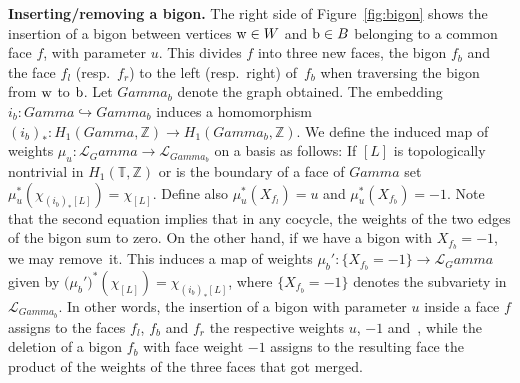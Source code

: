 \documentclass[10pt,a4paper]{amsart}
\numberwithin{equation}{section}
\newcommand{\Z}{{\mathbb Z}}
\newcommand{\T}{{\mathbb T}}
\newcommand{\ra}{\rightarrow}
\newcommand{\w}{{\rm w}}
\newcommand{\bw}{{\rm b}}
\def\Gamma{Gamma}
\begin{document}
	
	{\bf Inserting/removing a bigon.}
	The right side of Figure~\ref{fig:bigon} shows the insertion of a bigon between vertices $\w \in W$ and $\bw \in B$ belonging to a common face $f$, with parameter $u$. This divides $f$ into three new faces, the bigon $f_b$ and the face $f_l$ (resp.\ $f_r$) to the left (resp.\ right) of~$f_b$ when traversing the bigon from $\rm w$ to $\rm b$. Let $\Gamma_b$ denote the graph obtained. The embedding $i_b\colon \Gamma \hookrightarrow \Gamma_b$ induces a homomorphism $(i_b)_*\colon H_1(\Gamma,\Z) \ra H_1(\Gamma_b,\Z)$. We define the induced map of weights $\mu_u\colon \mathcal L_\Gamma \ra \mathcal L_{\Gamma_b}$ on a basis as follows: If $[L]$ is topologically nontrivial in $H_1(\T,\Z)$ or is the boundary of a face of $\Gamma$ set $\mu_u^*(\chi_{(i_b)_*[L]})=\chi_{[L]}$. Define also $\mu_u^*(X_{f_l})=u$ and $\mu_u^*(X_{f_b})=-1$. Note that the second equation implies that in any cocycle, the weights of the two edges of the bigon sum to zero. On the other hand, if we have a bigon with $X_{f_b}=-1$, we may remove~it. This induces a map of weights $\mu_b'\colon \{X_{f_b}=-1\} \ra \mathcal L_\Gamma$ given by $\big(\mu_b'\big)^*(\chi_{[L]})=\chi_{(i_b)_*[L]}$, where $\{X_{f_b}=-1\}$ denotes the subvariety in $ \mathcal L_{\Gamma_b}$. In other words, the insertion of a bigon with parameter $u$ inside a face $f$ assigns to the faces $f_l$, $f_b$ and $f_r$ the respective weights $u$, $-1$ and~, while the deletion of a bigon $f_b$ with face weight $-1$ assigns to the resulting face the product of the weights of the three faces that got merged.
	
\end{document}
